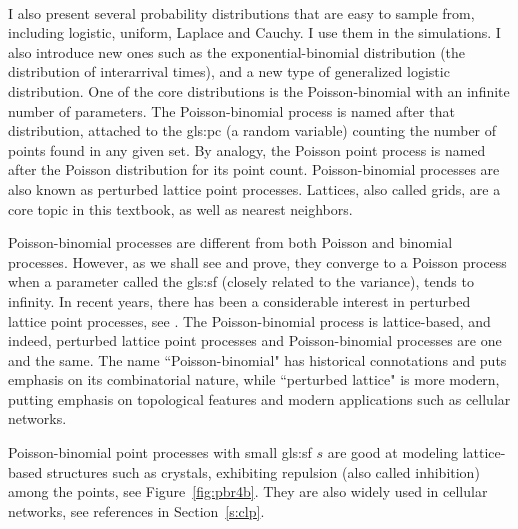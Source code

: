 \documentclass[10pt]{article}
\begin{document}
\quad \\

I also present several probability distributions that are easy to sample from, including logistic, uniform, Laplace and Cauchy. I use them in the simulations. I also introduce new ones  such as the \textcolor{index}{exponential-binomial distribution} (the distribution of interarrival times), and a new type of \textcolor{index}{generalized logistic distribution}. One of the core distributions is the \textcolor{index}{Poisson-binomial} with an infinite number of parameters. The Poisson-binomial process is named after that distribution, attached to the  
\gls{gls:pc} (a random variable) counting the number of points found in any given set. By analogy, the Poisson point process is named after the Poisson distribution for its point count. Poisson-binomial processes are also known as \textcolor{index}{perturbed lattice point processes}.
Lattices, also called \textcolor{index}{grids}, are a core topic in this textbook, as well as \textcolor{index}{nearest neighbors}.

Poisson-binomial processes are different from both Poisson and \textcolor{index}{binomial processes}. However, as we shall see and prove, they converge to a \textcolor{index}{Poisson process} when a parameter called the \gls{gls:sf} (closely related to the variance), tends to infinity. In recent years, there has been a considerable interest in perturbed lattice point processes, see \cite{ghosh2020,poi103}. The \textcolor{index}{Poisson-binomial process} is lattice-based, and indeed, \textcolor{index}{perturbed lattice point processes} and Poisson-binomial processes are one and the same. The name ``Poisson-binomial" has historical connotations and puts emphasis on its combinatorial nature, while ``perturbed lattice" is more modern, putting emphasis on topological features and modern applications such as cellular networks.  

Poisson-binomial point processes with small \gls{gls:sf} $s$ are good at modeling lattice-based structures such as crystals, exhibiting \textcolor{index}{repulsion} (also called \textcolor{index}{inhibition}) among the points, see Figure~\ref{fig:pbr4b}.  They are also widely used in cellular networks, see references in Section~\ref{s:clp}. 
\end{document}
